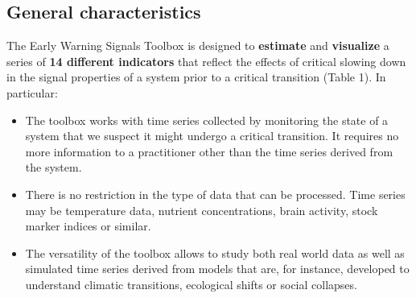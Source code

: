\documentclass[12pt,a4paper,final]{article}
\begin{document}
\subsection{General characteristics}
The Early Warning Signals Toolbox is designed to \textbf{estimate} and \textbf{visualize} a series of \textbf{14 different indicators} that reflect the effects of critical slowing down in the signal properties of a system prior to a critical transition (Table 1). In particular:
\begin{itemize}
\item The toolbox works with time series collected by monitoring the state of a system that we suspect it might undergo a critical transition. It requires no more information to a practitioner other than the time series derived from the system.
\item There is no restriction in the type of data that can be processed. Time series may be temperature data, nutrient concentrations, brain activity, stock marker indices or similar. 
\item The versatility of the toolbox allows to study both real world data as well as simulated time series derived from models that are, for instance, developed to understand climatic transitions, ecological shifts or social collapses.
\end{itemize}
\end{document}
